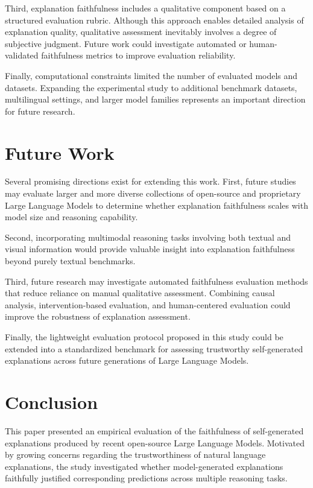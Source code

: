 \documentclass{article}
\begin{document}
Third, explanation faithfulness includes a qualitative component based on a structured evaluation rubric. Although this approach enables detailed analysis of explanation quality, qualitative assessment inevitably involves a degree of subjective judgment. Future work could investigate automated or human-validated faithfulness metrics to improve evaluation reliability.

Finally, computational constraints limited the number of evaluated models and datasets. Expanding the experimental study to additional benchmark datasets, multilingual settings, and larger model families represents an important direction for future research.





\section{Future Work}

Several promising directions exist for extending this work. First, future studies may evaluate larger and more diverse collections of open-source and proprietary Large Language Models to determine whether explanation faithfulness scales with model size and reasoning capability.

Second, incorporating multimodal reasoning tasks involving both textual and visual information would provide valuable insight into explanation faithfulness beyond purely textual benchmarks.

Third, future research may investigate automated faithfulness evaluation methods that reduce reliance on manual qualitative assessment. Combining causal analysis, intervention-based evaluation, and human-centered evaluation could improve the robustness of explanation assessment.

Finally, the lightweight evaluation protocol proposed in this study could be extended into a standardized benchmark for assessing trustworthy self-generated explanations across future generations of Large Language Models.





\section{Conclusion}

This paper presented an empirical evaluation of the faithfulness of self-generated explanations produced by recent open-source Large Language Models. Motivated by growing concerns regarding the trustworthiness of natural language explanations, the study investigated whether model-generated explanations faithfully justified corresponding predictions across multiple reasoning tasks.
\end{document}
